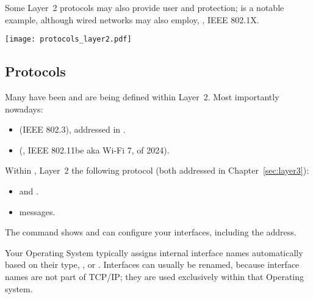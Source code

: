 Some Layer~2 protocols may also provide user  and
 protection; 
 is a notable example,
although wired networks may also employ, \eg, IEEE 802.1X.

\vspace{-0.3cm}
\begin{center}
\texttt{[image: protocols\_layer2.pdf]}
\end{center}
\vspace{-0.5cm}

\subsection*{Protocols}
Many  have been and are being defined within Layer~2. Most importantly nowadays:\\[-0.65cm]
\begin{itemize}
\item {} (IEEE 802.3), addressed in .
\item {} (\eg, IEEE 802.11be aka Wi-Fi 7, of 2024).
\end{itemize}

Within , Layer~2  the following protocol 
(both addressed in Chapter~\ref{sec:layer3}):\\[-0.65cm]
\begin{itemize}
  \item {} and  .
  \item {} messages.\\[-0.75cm]
\end{itemize}

\vspace{0.5cm}

\begin{remark}
The  command shows and can configure your interfaces,
including the  address.

Your Operating System typically assigns internal interface names automatically based on their type,
\eg,  or .
% 
Interfaces can usually be renamed, because interface names 
are not part of TCP/IP; they are used exclusively within that Operating system.
\end{remark}


